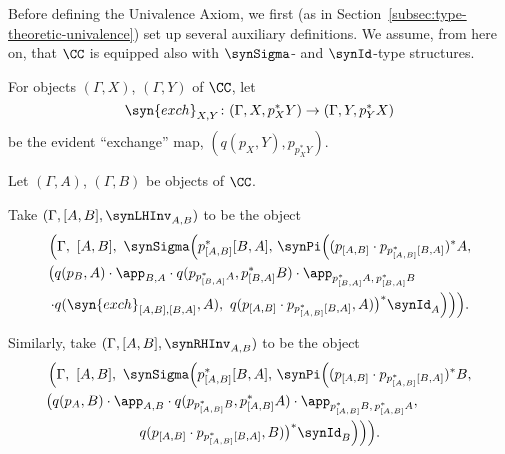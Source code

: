 Before defining the Univalence Axiom, we first (as in Section~\ref{subsec:type-theoretic-univalence}) set up several auxiliary definitions.  We assume, from here on, that $\CC$ is equipped also with $\synSigma$- and $\synId$-type structures.

\begin{definition}
For objects $(\Gamma,X)$, $(\Gamma,Y)$ of $\CC$, let 
\[ \syn{exch}_{X,Y} \colon (\Gamma,X,p_X^*Y) \to (\Gamma,Y,p_Y^*X) \]
be the evident ``exchange'' map, $(q(p_X,Y), p_{p_X^*Y})$.
\end{definition}

\begin{definition}
Let $(\Gamma,A)$, $(\Gamma,B)$ be objects of $\CC$.

Take $(\Gamma,[A,B],\synLHInv_{A,B})$ to be the object
\begin{multline*}
  \Big(\Gamma,\ [A,B],\ \synSigma\Big( p_{[A,B]}^*[B,A] ,\, \synPi \Big( (p_{[A,B]}  \cdot p_{p_{[A,B]}^*[B,A]})^*A, \\
  \big(q(p_B,A) \cdot \app_{B,A} \cdot q(p_{p_{[B,A]}^*A},p_{[B,A]}^*B) \cdot \app_{p_{[B,A]}^*A,\,p_{[B,A]}^*B}  \qquad \qquad \\
   \cdot q(\syn{exch}_{[A,B],[B,A]},A),\ q(p_{[A,B]} \cdot p_{p_{[A,B]}^*[B,A]},A)\big)^*\synId_A \Big) \Big) \Big).
\end{multline*}


Similarly, take $(\Gamma,[A,B],\synRHInv_{A,B})$ to be the object
\begin{multline*}
  \Big(\Gamma,\ [A,B],\ \synSigma\Big( p_{[A,B]}^*[B,A] ,\, \synPi \Big( (p_{[A,B]}  \cdot p_{p_{[A,B]}^*[B,A]})^*B, \\
  \big(q(p_A,B) \cdot \app_{A,B} \cdot q(p_{p_{[A,B]}^*B},p_{[A,B]}^*A) \cdot \app_{p_{[A,B]}^*B,\,p_{[A,B]}^*A}, \qquad \qquad \\
   q(p_{[A,B]} \cdot p_{p_{[A,B]}^*[B,A]},B)\big)^*\synId_B \Big) \Big) \Big).
\end{multline*}


\end{definition}
